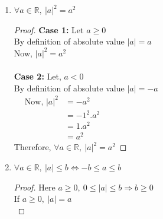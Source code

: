 \documentclass{article}
\newcommand{\Rw}{\Rightarrow}
\newcommand{\hs}{\hspace}
\begin{document}
\begin{enumerate}
\begin{proof}
\begin{align*}
            &= 1.ab \hs{3cm}\text{[Identity property]}\\
            &= (-1)(-1).ab\\
            &= (-1)a.(-1)b \hs{2cm}\text{[Associative property]}\\
            &= (-a)(-b)\\
            &= |a|||b|
        \end{align*}
        \textbf{Case 4: } $a>0$ and $b<0$, then $ab<0$ [Using ordered properties]\\
        Also by definition of absolute value, $|a|=a,\ |b|=-b $\\
        \begin{align*}
            \text{Now, } |ab|&=-ab \hs{10cm}\\
            &= a(-b)\\
            &= |a||b|
        \end{align*}
        Similarly, if $a<0$ and $b>0$, then $|ab|=|a||b|$\\
        Therefore, $\forall a,b \in \mathbb{R} \ |ab|=|a||b|$\\
    \end{proof}
    \item $\forall a \in \mathbb{R},\ |a|^2=a^2$
    \begin{proof}
            \textbf{Case 1: }Let $a\geq 0$\\
            By definition of absolute value $|a|=a$\\
            Now, $|a|^2=a^2$\\\\
            \textbf{Case 2: } Let, $a<0$\\
            By definition of absolute value $|a|=-a$\\
            \begin{align*}
            \text{Now, } |a|^2&=-a^2 \hs{10cm}\\
            &= -1^2.a^2\\
            &= 1.a^2\\
            &= a^2        
            \end{align*}
            Therefore, $\forall a \in \mathbb{R},\ |a|^2=a^2$
    \end{proof}
    \item $\forall a \in \mathbb{R},\ |a|\leq b \Leftrightarrow -b \leq a \leq b$
    \begin{proof}
        Here $a \geq 0,\ 0\leq |a| \leq b \Rw b \geq 0$\\
        If $a \geq 0,\ |a|=a$\\

\end{proof}
\end{enumerate}
\end{document}

